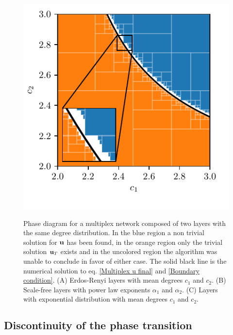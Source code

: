 \documentclass[
11pt, %
american, %
singlespacing, %
final, %
nolistspacing, %
liststotoc, %
headsepline, %
]{MastersDoctoralThesis} %
\begin{document}
\begin{figure}
{\begin{subfloatrow}
{		}{\caption{}}
	\end{subfloatrow}
	\begin{subfloatrow}
		{
			\capcorrection
			\includegraphics[scale=0.85]{critical_region_GeometricGraph_GeometricGraph.pdf}
		}{\caption{}}
	\end{subfloatrow}
	}{
	\caption{Phase diagram for a multiplex network composed of two layers with the same degree distribution. In the blue region a non trivial solution for $\boldsymbol{\mathrm{u}}$ has been found, in the orange region only the trivial solution $\boldsymbol{\mathrm{u}}_T$ exists and in the uncolored region the algorithm was unable to conclude in favor of either case. The solid black line is the numerical solution to eq. \eqref{Multiplex u final} and \eqref{Boundary condition}. (A) Erdos-Renyi layers with mean degrees $c_1$ and $c_2$. (B) Scale-free layers with power law exponents $\alpha_1$ and $\alpha_2$. (C) Layers with exponential distribution with mean degrees $c_1$ and $c_2$.}
	\label{Figure: Regions and boundary}
	}
\end{figure}

\subsection{Discontinuity of the phase transition}
\label{Section: Discontinuous phase transition}
\end{document}
